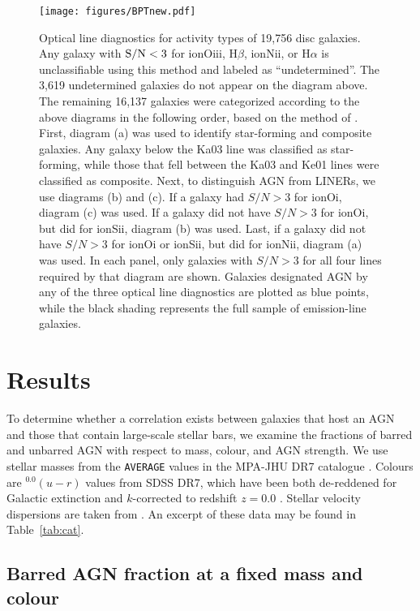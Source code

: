\begin{figure*}
\texttt{[image: figures/BPTnew.pdf]}
\caption{Optical line diagnostics for activity types of 19,756 disc galaxies. Any galaxy with $\rm S/N < 3$ for ion{O}{iii}, H$\beta$, ion{N}{ii}, or H$\alpha$ is unclassifiable using this method and labeled as ``undetermined''. The 3,619 undetermined galaxies do not appear on the diagram above. The remaining 16,137 galaxies were categorized according to the above diagrams in the following order, based on the method of \citet{Ski07}. First, diagram (a) was used to identify star-forming and composite galaxies. Any galaxy below the Ka03 line was classified as star-forming, while those that fell between the Ka03 and Ke01 lines were classified as composite. Next, to distinguish AGN from LINERs, we use diagrams (b) and (c). If a galaxy had $S/N > 3$ for ion{O}{i}, diagram (c) was used. If a galaxy did not have $S/N > 3$ for ion{O}{i}, but did for ion{S}{ii}, diagram (b) was used. Last, if a galaxy did not have $S/N > 3$ for ion{O}{i} or ion{S}{ii}, but did for ion{N}{ii}, diagram (a) was used. In each panel, only galaxies with $S/N > 3$ for all four lines required by that diagram are shown. Galaxies designated AGN by any of the three optical line diagnostics are plotted as blue points, while the black shading represents the full sample of emission-line galaxies.}
\label{BPT}
\end{figure*}
\section{Results}
\label{sec:Results}

To determine whether a correlation exists between galaxies that host an AGN and those that contain large-scale stellar bars, we examine the fractions of barred and unbarred AGN with respect to mass, colour, and AGN strength. We use stellar masses from the {\tt AVERAGE} values in the MPA-JHU DR7 catalogue \citep{Kauffmann03b}. Colours are $^{0.0}(u-r)$ values from SDSS DR7, which have been both de-reddened for Galactic extinction and $k$-corrected to redshift $z=0.0$ \citep{csa03}. Stellar velocity dispersions are taken from \citet{OSSY}. An excerpt of these data may be found in Table~\ref{tab:cat}.

\subsection{Barred AGN fraction at a fixed mass and colour}\label{ssec:barredfraction}
 
